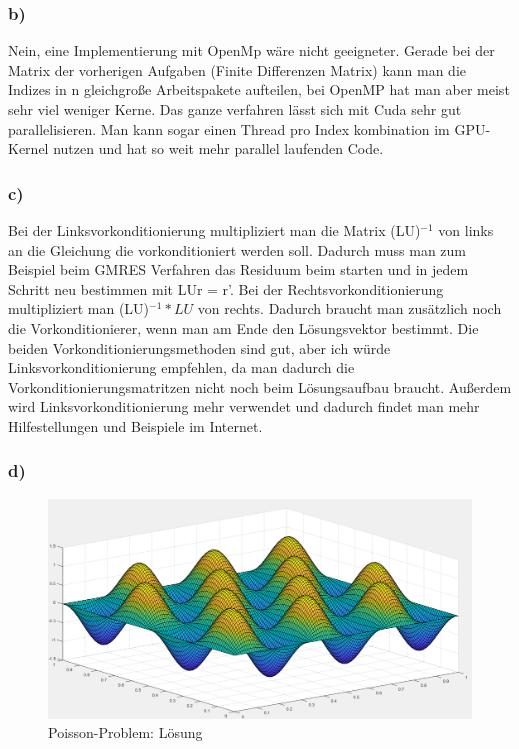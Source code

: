 \documentclass{report}
\begin{document}
\subsubsection{b)}
Nein, eine Implementierung mit OpenMp wäre nicht geeigneter. Gerade bei der Matrix der vorherigen Aufgaben (Finite Differenzen Matrix) kann man die Indizes in n gleichgroße Arbeitspakete aufteilen, bei OpenMP hat man aber meist sehr viel weniger Kerne. Das ganze verfahren lässt sich mit Cuda sehr gut parallelisieren. Man kann sogar einen Thread pro Index kombination im GPU-Kernel nutzen und hat so weit mehr parallel laufenden Code.

\subsubsection{c)}
Bei der Linksvorkonditionierung multipliziert man die Matrix (LU)$^{-1}$ von links an die Gleichung die vorkonditioniert werden soll. Dadurch muss man zum Beispiel beim GMRES Verfahren das Residuum beim starten und in jedem Schritt neu bestimmen mit LUr = r'. Bei der Rechtsvorkonditionierung multipliziert man (LU)$^{-1}*LU$ von rechts. Dadurch braucht man zusätzlich noch die Vorkonditionierer, wenn man am Ende den Lösungsvektor bestimmt. 
Die beiden Vorkonditionierungsmethoden sind gut, aber ich würde Linksvorkonditionierung empfehlen, da man dadurch die Vorkonditionierungsmatritzen nicht noch beim Lösungsaufbau braucht. Außerdem wird Linksvorkonditionierung mehr verwendet und dadurch findet man mehr Hilfestellungen und Beispiele im Internet.

\subsubsection{d)}
\begin{figure}
	\includegraphics[width=\linewidth]{Aufgaben-Ressourcen/A6L7M3N2.png}
		\caption{Poisson-Problem: Lösung}
\end{figure}
\end{document}
